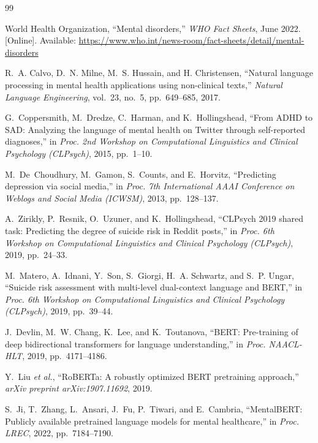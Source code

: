\documentclass[conference, 10pt]{IEEEtran}
\begin{document}
\begin{thebibliography}{99}

World Health Organization, ``Mental disorders,'' \textit{WHO Fact Sheets}, June 2022. [Online]. Available: \url{https://www.who.int/news-room/fact-sheets/detail/mental-disorders}

R.~A. Calvo, D.~N. Milne, M.~S. Hussain, and H. Christensen, ``Natural language processing in mental health applications using non-clinical texts,'' \textit{Natural Language Engineering}, vol.~23, no.~5, pp.~649--685, 2017.

G.~Coppersmith, M.~Dredze, C.~Harman, and K.~Hollingshead, ``From ADHD to SAD: Analyzing the language of mental health on Twitter through self-reported diagnoses,'' in \textit{Proc. 2nd Workshop on Computational Linguistics and Clinical Psychology (CLPsych)}, 2015, pp.~1--10.

M.~De~Choudhury, M.~Gamon, S.~Counts, and E.~Horvitz, ``Predicting depression via social media,'' in \textit{Proc. 7th International AAAI Conference on Weblogs and Social Media (ICWSM)}, 2013, pp.~128--137.

A.~Zirikly, P.~Resnik, O.~Uzuner, and K.~Hollingshead, ``CLPsych 2019 shared task: Predicting the degree of suicide risk in Reddit posts,'' in \textit{Proc. 6th Workshop on Computational Linguistics and Clinical Psychology (CLPsych)}, 2019, pp.~24--33.

M.~Matero, A.~Idnani, Y.~Son, S.~Giorgi, H.~A. Schwartz, and S.~P. Ungar, ``Suicide risk assessment with multi-level dual-context language and BERT,'' in \textit{Proc. 6th Workshop on Computational Linguistics and Clinical Psychology (CLPsych)}, 2019, pp.~39--44.

J.~Devlin, M.~W. Chang, K.~Lee, and K.~Toutanova, ``BERT: Pre-training of deep bidirectional transformers for language understanding,'' in \textit{Proc. NAACL-HLT}, 2019, pp.~4171--4186.

Y.~Liu \textit{et al.}, ``RoBERTa: A robustly optimized BERT pretraining approach,'' \textit{arXiv preprint arXiv:1907.11692}, 2019.

S.~Ji, T.~Zhang, L.~Ansari, J.~Fu, P.~Tiwari, and E.~Cambria, ``MentalBERT: Publicly available pretrained language models for mental healthcare,'' in \textit{Proc. LREC}, 2022, pp.~7184--7190.


\end{thebibliography}
\end{document}
